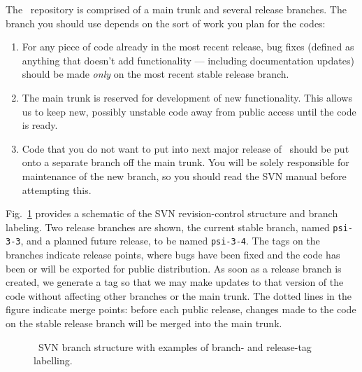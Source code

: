 The \PSIthree\ repository is comprised of a main trunk and several
release branches.  The branch you should use depends on the sort of 
work you plan for the codes:
\begin{enumerate}
\item For any piece of code already in the most recent release, bug
  fixes (defined as anything that doesn't add functionality ---
  including documentation updates) should be made {\em only} on the
  most recent stable release branch.
\item The main trunk is reserved for development of new functionality.
  This allows us to keep new, possibly unstable code away from public
  access until the code is ready.
\item Code that you do not want to put into next major release of
  \PSIthree\ should be put onto a separate branch off the main
  trunk. You will be solely responsible for maintenance of the new
  branch, so you should read the SVN manual before attempting this.
\end{enumerate}

\noindent Fig.~\ref{Fig:svn} provides a schematic of the SVN
revision-control structure and branch labeling.  Two release branches
are shown, the current stable branch, named {\tt psi-3-3}, and a
planned future release, to be named {\tt psi-3-4}.  The tags on the
branches indicate release points, where bugs have been fixed and the
code has been or will be exported for public distribution.  As soon as
a release branch is created, we generate a tag so that we may make
updates to that version of the code without affecting other branches
or the main trunk.  The dotted lines in the figure indicate merge
points: before each public release, changes made to the code on the
stable release branch will be merged into the main trunk.



\begin{figure}[h]
\begin{center}
\end{center}
\caption{\PSIthree\ SVN branch structure with examples of branch- and
release-tag labelling.}
\label{Fig:svn}
\end{figure}

